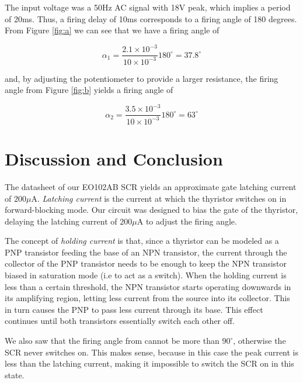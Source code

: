 \documentclass[journal]{IEEEtran}
\begin{document}
The input voltage was a 50Hz AC signal with 18V peak, which implies a period of
20ms. Thus, a firing delay of 10ms corresponds to a firing angle of 180 degrees.
From Figure \ref{fig:a} we can see that we have a firing angle of

\begin{equation}
	\alpha_1 = \frac{2.1 \times 10^{-3}}{10 \times 10^{-3}} 180^\circ = 37.8^\circ
	\label{eq:alpha_1}
\end{equation}

and, by adjusting the potentiometer to provide a larger resistance, the firing
angle from Figure \ref{fig:b} yields a firing angle of

\begin{equation}
	\alpha_2 = \frac{3.5 \times 10^{-3}}{10 \times 10^{-3}} 180^\circ = 63^\circ
	\label{eq:alpha_2}
\end{equation}

\section{Discussion and Conclusion}

The datasheet of our EO102AB SCR \cite{scr_datasheet} yields an approximate gate
latching current of $200\mu$A. \textit{Latching current} is the current at
which the thyristor switches on in forward-blocking mode. Our circuit was
designed to bias the gate of the thyristor, delaying the latching current of
$200\mu$A to adjust the firing angle.

The concept of \textit{holding current} is that, since a thyristor can be
modeled as a PNP transistor feeding the base of an NPN transistor, the current
through the collector of the PNP transistor needs to be enough to keep the NPN
transistor biased in saturation mode (i.e to act as a switch). When the holding
current is less than a certain threshold, the NPN transistor starts operating
downwards in its amplifying region, letting less current from the source into
its collector. This in turn causes the PNP to pass less current through its
base. This effect continues until both transistors essentially switch each
other off.

We also saw that the firing angle from cannot be more than $90^\circ$,
otherwise the SCR never switches on. This makes sense, because in this case the
peak current is less than the latching current, making it impossible to switch
the SCR on in this state.

\end{document}
